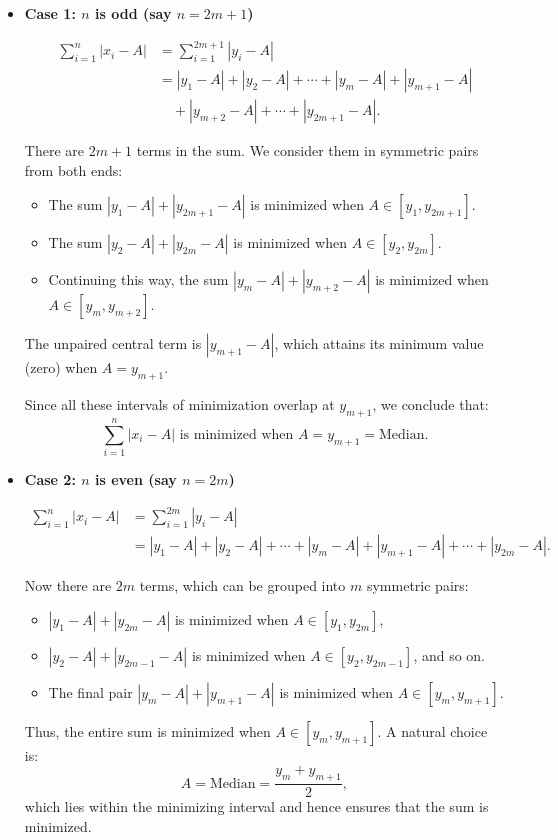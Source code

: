 \documentclass[twoside]{book}
\begin{document}
\begin{itemize}
    \item \textbf{Case 1: \( n \) is odd (say \( n = 2m + 1 \))}

    \begin{align*}
    \sum_{i=1}^{n} |x_i - A| &= \sum_{i=1}^{2m+1} |y_i - A| \\
    &= |y_1 - A| + |y_2 - A| + \cdots + |y_m - A| + |y_{m+1} - A| \\
    &\quad + |y_{m+2} - A| + \cdots + |y_{2m+1} - A|.
    \end{align*}

    There are \( 2m + 1 \) terms in the sum. We consider them in symmetric pairs from both ends:

    \begin{itemize}
        \item The sum \( |y_1 - A| + |y_{2m+1} - A| \) is minimized when \( A \in [y_1, y_{2m+1}] \).
        \item The sum \( |y_2 - A| + |y_{2m} - A| \) is minimized when \( A \in [y_2, y_{2m}] \).
        \item Continuing this way, the sum \( |y_m - A| + |y_{m+2} - A| \) is minimized when \( A \in [y_m, y_{m+2}] \).
    \end{itemize}

    The unpaired central term is \( |y_{m+1} - A| \), which attains its minimum value (zero) when \( A = y_{m+1} \).

    Since all these intervals of minimization overlap at \( y_{m+1} \), we conclude that:
    \[
    \sum_{i=1}^{n} |x_i - A| \text{ is minimized when } A = y_{m+1} = \text{Median}.
    \]

    \item \textbf{Case 2: \( n \) is even (say \( n = 2m \))}

    \begin{align*}
    \sum_{i=1}^{n} |x_i - A| &= \sum_{i=1}^{2m} |y_i - A| \\
    &= |y_1 - A| + |y_2 - A| + \cdots + |y_m - A| + |y_{m+1} - A| + \cdots + |y_{2m} - A|.
    \end{align*}

    Now there are \( 2m \) terms, which can be grouped into \( m \) symmetric pairs:

    \begin{itemize}
        \item \( |y_1 - A| + |y_{2m} - A| \) is minimized when \( A \in [y_1, y_{2m}] \),
        \item \( |y_2 - A| + |y_{2m-1} - A| \) is minimized when \( A \in [y_2, y_{2m-1}] \), and so on.
        \item The final pair \( |y_m - A| + |y_{m+1} - A| \) is minimized when \( A \in [y_m, y_{m+1}] \).
    \end{itemize}

    Thus, the entire sum is minimized when \( A \in [y_m, y_{m+1}] \). A natural choice is:
    \[
    A = \text{Median} = \frac{y_m + y_{m+1}}{2},
    \]
    which lies within the minimizing interval and hence ensures that the sum is minimized.
\end{itemize}
\end{document}
